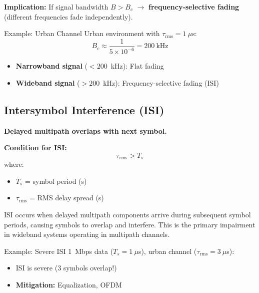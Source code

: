 \textbf{Implication:} If signal bandwidth $B > B_c$ $\rightarrow$ \textbf{frequency-selective fading} (different frequencies fade independently).

\begin{calloutbox}{Example: Urban Channel}
Urban environment with $\tau_{\text{rms}} = 1~\mu$s:
\begin{equation*}
B_c \approx \frac{1}{5 \times 10^{-6}} = 200~\text{kHz}
\end{equation*}

\begin{itemize}
\item \textbf{Narrowband signal} ($< 200$~kHz): Flat fading
\item \textbf{Wideband signal} ($> 200$~kHz): Frequency-selective fading (ISI)
\end{itemize}
\end{calloutbox}

\subsection{Intersymbol Interference (ISI)}

\textbf{Delayed multipath overlaps with next symbol.}

\textbf{Condition for ISI:}
\begin{equation}
\tau_{\text{rms}} > T_s
\label{eq:isi-condition}
\end{equation}
where:
\begin{itemize}
\item $T_s$ = symbol period (s)
\item $\tau_{\text{rms}}$ = RMS delay spread (s)
\end{itemize}

\begin{warningbox}
ISI occurs when delayed multipath components arrive during subsequent symbol periods, causing symbols to overlap and interfere. This is the primary impairment in wideband systems operating in multipath channels.
\end{warningbox}

\begin{calloutbox}{Example: Severe ISI}
1~Mbps data ($T_s = 1~\mu$s), urban channel ($\tau_{\text{rms}} = 3~\mu$s):
\begin{itemize}
\item ISI is severe (3 symbols overlap!)
\item \textbf{Mitigation:} Equalization, OFDM
\end{itemize}
\end{calloutbox}

